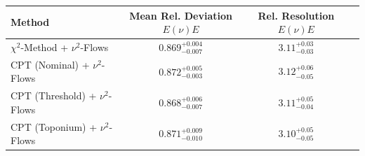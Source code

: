     \begin{tabular}{lccc}
        \toprule
        Method & Mean Rel. Deviation $E(\nu)E$ & Rel. Resolution $E(\nu)E$ \\
        \midrule
        $\chi^2$-Method + $\nu^2$-Flows & $0.869^{+0.004}_{-0.007}$ & $3.11^{+0.03}_{-0.03}$ \\
        CPT (Nominal) + $\nu^2$-Flows & $0.872^{+0.005}_{-0.003}$ & $3.12^{+0.06}_{-0.05}$ \\
        CPT (Threshold) + $\nu^2$-Flows & $0.868^{+0.006}_{-0.007}$ & $3.11^{+0.05}_{-0.04}$ \\
        CPT (Toponium) + $\nu^2$-Flows & $0.871^{+0.009}_{-0.010}$ & $3.10^{+0.05}_{-0.05}$ \\
        \bottomrule
    \end{tabular}